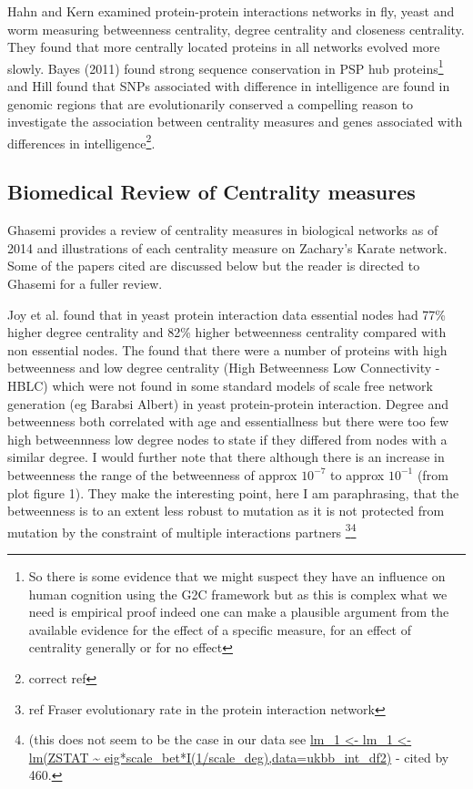 Hahn and Kern\cite{hahn2005comparative} examined protein-protein interactions networks in fly, yeast and worm measuring betweenness centrality, degree centrality and closeness centrality. They found that more centrally located proteins in all networks evolved more slowly. Bayes (2011)\cite{bayes2011characterization} found strong sequence conservation in PSP hub proteins\footnote{ So there is some evidence that we might suspect they have an influence on human cognition using the G2C framework but as this is complex what we need is empirical proof indeed one can make a plausible argument from the available evidence for the effect of a specific measure, for an effect of centrality generally or for no effect} and Hill found that SNPs associated with difference in intelligence are found in genomic regions that are evolutionarily conserved\cite{hill2016molecular} a compelling reason to investigate the association between centrality measures and genes associated with differences in intelligence\footnote{correct ref}.




\subsection{Biomedical Review of Centrality measures}
\label{sec:biomedical review centrality}
Ghasemi provides a review of centrality measures in biological networks as of 2014 and illustrations of each centrality measure on Zachary's Karate network\cite{ghasemi2014centrality}. Some of the papers cited are discussed below but the reader is directed to Ghasemi \cite{ghasemi2014centrality} for a fuller review. 


    Joy et al.\cite{joy2005high} found that in yeast protein interaction data essential nodes had 77\% higher degree centrality and 82\% higher betweenness centrality compared with non essential nodes. The found that there were a number of proteins with high betweenness and low degree centrality (High Betweenness Low Connectivity - HBLC) which were not found in some standard models of scale free network generation (eg Barabsi Albert) in yeast protein-protein interaction. Degree and betweenness both correlated with age and essentiallness but there were too few high betweennness low degree nodes to state if they differed from nodes with a similar degree. I would further note that there although there is an increase in betweenness the range of the betweenness of approx $10^{-7}$ to approx $10^{-1}$ (from plot figure 1). They make the interesting point, here I am paraphrasing, that the betweenness is to an extent less robust to mutation as it is not protected from mutation by the constraint of multiple interactions partners \footnote{ref Fraser evolutionary rate in the protein interaction network}\footnote{(this does not seem to be the case in our data see \url{lm_1 <- lm_1 <- lm(ZSTAT ~  eig*scale_bet*I(1/scale_deg),data=ukbb_int_df2)} - cited by 460.}
    
